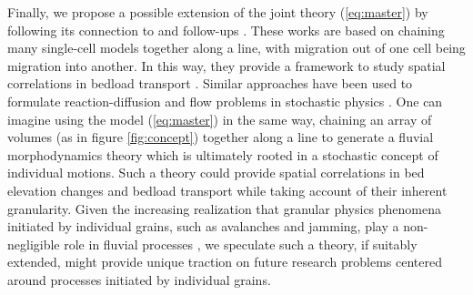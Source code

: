 \documentclass[draft]{agujournal2018}
\begin{document}
Finally, we propose a possible extension of the joint theory (\ref{eq:master}) by following its connection to \citet{Ancey2008} and follow-ups \citep[e.g.][]{Ancey2014a, Heyman2014, Heyman2015}.
These works are based on chaining many \citet{Ancey2008} single-cell models together along a line, with migration out of one cell being migration into another.
In this way, they provide a framework to study spatial correlations in bedload transport \citep[e.g.][]{Heyman2014,Heyman2015}.
Similar approaches have been used to formulate reaction-diffusion and flow problems in stochastic physics \citep[e.g.][]{Gardiner1983}. 
One can imagine using the model (\ref{eq:master}) in the same way, chaining an array of volumes (as in figure \ref{fig:concept}) together along a line to generate a fluvial morphodynamics theory which is ultimately rooted in a stochastic concept of individual motions.
Such a theory could provide spatial correlations in bed elevation changes and bedload transport while taking account of their inherent granularity.
Given the increasing realization that granular physics phenomena initiated by individual grains, such as avalanches and jamming, play a non-negligible role in fluvial processes \citep[e.g.][]{Saletti2016,Dhont2018}, we speculate such a theory, if suitably extended, might provide unique traction on future research problems centered around processes initiated by individual grains.
\end{document}
